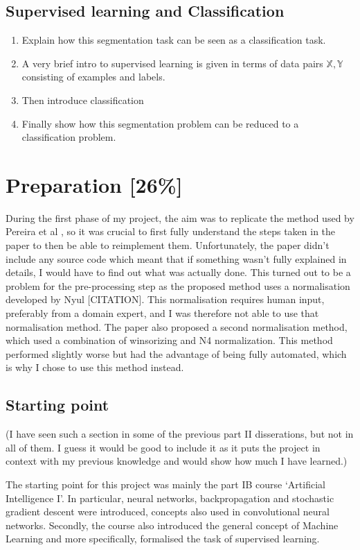 \documentclass[12pt,a4paper,twoside,openright]{report}
\begin{document}
\section{Supervised learning and Classification}
\begin{enumerate}
	\item Explain how this segmentation task can be seen as a classification task.
	\item A very brief intro to supervised learning is given in terms of data pairs $\mathbb{X}, \mathbb{Y}$ consisting of examples and labels.
	\item Then introduce classification
	\item Finally show how this segmentation problem can be reduced to a classification problem.
\end{enumerate}
\chapter{Preparation [26\%]}
During the first phase of my project, the aim was to replicate the method used by Pereira et al \cite{pereira}, so it was crucial to first fully understand the steps taken in the paper to then be able to reimplement them. Unfortunately, the paper didn't include any source code which meant that if something wasn't fully explained in details, I would have to find out what was actually done. This turned out to be a problem for the pre-processing step as the proposed method uses a normalisation developed by Nyul [CITATION]. This normalisation requires human input, preferably from a domain expert, and I was therefore not able to use that normalisation method. The paper also proposed a second normalisation method, which used a combination of winsorizing and N4 normalization. This method performed slightly worse but had the advantage of being fully automated, which is why I chose to use this method instead.\\

\section{Starting point}
(I have seen such a section in some of the previous part II disserations, but not in all of them. I guess it would be good to include it as it puts the project in context with my previous knowledge and would show how much I have learned.)

The starting point for this project was mainly the part IB course `Artificial Intelligence I'. In particular, neural networks, backpropagation and stochastic gradient descent were introduced, concepts also used in convolutional neural networks. Secondly, the course also introduced the general concept of Machine Learning and more specifically, formalised the task of supervised learning.
\end{document}
